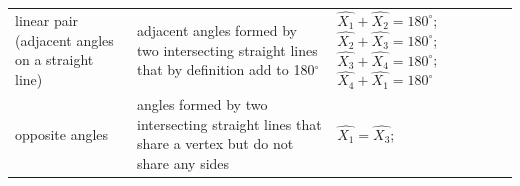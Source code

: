 {{\begin{center}
\begin{tabular}[t]{|l|l|l|}
     \tabularnewline\cline{1-1}\cline{2-2}\cline{3-3}
        linear pair (adjacent angles on a straight line) &
        adjacent angles formed by two intersecting straight lines that by definition add to 180\begin{math}{}^{\circ }\end{math} &
                  \begin{math}\hat{{X}_{1}}+\hat{{X}_{2}}={180}^{\circ }\end{math};
                  \begin{math}\hat{{X}_{2}}+\hat{{X}_{3}}={180}^{\circ }\end{math};
                  \begin{math}\hat{{X}_{3}}+\hat{{X}_{4}}={180}^{\circ }\end{math};
                  \begin{math}\hat{{X}_{4}}+\hat{{X}_{1}}={180}^{\circ }\end{math}
     \tabularnewline\cline{1-1}\cline{2-2}\cline{3-3}
        opposite angles &
        angles formed by two intersecting straight lines that share a vertex but do not share any sides &
                  \begin{math}\hat{{X}_{1}}=\hat{{X}_{3}}\end{math};

\end{tabular}
\end{center}}}
